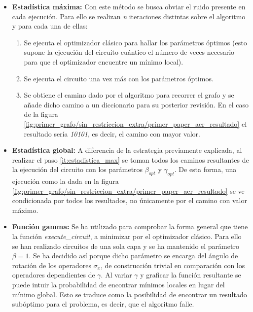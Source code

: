 \documentclass{article}
\begin{document}
\begin{itemize}
\item \textbf{Estadística máxima:}
  Con este método se busca obviar el ruido presente en cada ejecución. Para ello se realizan \textit{n} iteraciones distintas sobre el algoritmo y para cada una de ellas:
  \begin{enumerate}
  \item
    Se ejecuta el optimizador clásico para hallar los parámetros óptimos (esto supone la ejecución del circuito cuántico el número de veces necesario para que el optimizador encuentre un mínimo local).
  \item
    Se ejecuta el circuito una vez más con los parámetros óptimos.
  \item \label{it:estadistica_max}
    Se obtiene el camino dado por el algoritmo para recorrer el grafo y se añade dicho camino a un diccionario para su posterior revisión. En el caso de la figura \ref{fig:primer_grafo/sin_restriccion_extra/primer_paper_aer_resultado}
    el resultado sería \textit{10101}, es decir, el camino con mayor valor.
  \end{enumerate}
  
\item \textbf{Estadística global:}
  A diferencia de la estrategia previamente explicada, al realizar el paso \ref{it:estadistica_max} se toman todos los caminos resultantes de la ejecución del circuito con los parámetros \(\beta_{opt}\) y \(\gamma_{opt}\).
  De esta forma, una ejecución como la dada en la figura \ref{fig:primer_grafo/sin_restriccion_extra/primer_paper_aer_resultado}
  se ve condicionada por todos los resultados, no únicamente por el camino con valor máximo.
  
\item \textbf{Función gamma:}
  Se ha utilizado para comprobar la forma general que tiene la función \textit{execute\_circuit}, a minimizar por el optimizador clásico. Para ello se han realizado circuitos de una sola capa y se ha mantenido el parámetro \(\beta=1\). Se ha decidido así porque dicho parámetro se encarga del ángulo de rotación de los operadores \(\sigma_{x}\), de construcción trivial en comparación con los operadores dependientes de \(\gamma\).  %
  Al variar \(\gamma\) y graficar la función resultante se puede intuir la probabilidad de encontrar mínimos locales en lugar del mínimo global. Esto se traduce como la posibilidad de encontrar un resultado subóptimo para el problema, es decir, que el algoritmo falle.
\end{itemize}
\end{document}
